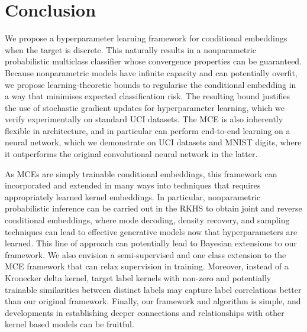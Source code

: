 \documentclass[twoside]{article}
\begin{document}
	\section{Conclusion}
	
	We propose a hyperparameter learning framework for conditional embeddings when the target is discrete. This naturally results in a nonparametric probabilistic multiclass classifier whose convergence properties can be guaranteed. Because nonparametric models have infinite capacity and can potentially overfit, we propose learning-theoretic bounds to regularise the conditional embedding in a way that minimises expected classification risk. The resulting bound justifies the use of stochastic gradient updates for hyperparameter learning, which we verify experimentally on standard UCI datasets. The \gls{MCE} is also inherently flexible in architecture, and in particular can perform end-to-end learning on a neural network, which we demonstrate on UCI datasets and MNIST digits, where it outperforms the original convolutional neural network in the latter.
	
	As \glspl{MCE} are simply trainable conditional embeddings, this framework can incorporated and extended in many ways into techniques that requires appropriately learned kernel embeddings. In particular, nonparametric probabilistic inference can be carried out in the RKHS to obtain joint and reverse conditional embeddings, where mode decoding, density recovery, and sampling techniques can lead to effective generative models now that hyperparameters are learned. This line of approach can potentially lead to Bayesian extensions to our framework. We also envision a semi-supervised and one class extension to the \gls{MCE} framework that can relax supervision in training. Moreover, instead of a Kronecker delta kernel, target label kernels with non-zero and potentially trainable similarities between distinct labels may capture label correlations better than our original framework. Finally, our framework and algorithm is simple, and developments in establishing deeper connections and relationships with other kernel based models can be fruitful. 
	
	\newpage
	
	
	
	
\end{document}
